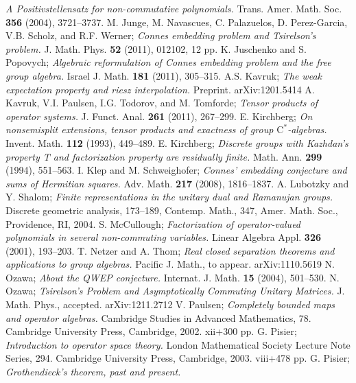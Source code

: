 \documentclass[12pt]{amsart}
\theoremstyle{definition}
\begin{document}
\begin{thebibliography}{MM}
\emph{A Positivstellensatz for non-commutative polynomials.}
Trans. Amer. Math. Soc. \textbf{356} (2004), 3721--3737.
 M. Junge, M. Navascues, C. Palazuelos, D. Perez-Garcia, V.B. Scholz, and R.F. Werner;
\emph{Connes embedding problem and Tsirelson's problem.}
J. Math. Phys. \textbf{52} (2011), 012102, 12 pp.
 K. Juschenko and S. Popovych;
\emph{Algebraic reformulation of Connes embedding problem and the free group algebra.}
Israel J. Math. \textbf{181} (2011), 305--315.
 A.S. Kavruk;
\emph{The weak expectation property and riesz interpolation.}
Preprint. arXiv:1201.5414
 A. Kavruk, V.I. Paulsen, I.G. Todorov, and M. Tomforde;
\emph{Tensor products of operator systems.}
J. Funct. Anal. \textbf{261} (2011), 267--299.
 E. Kirchberg;
\emph{On nonsemisplit extensions, tensor products and exactness of group $\mathrm{C}^*$-algebras.}
Invent. Math. \textbf{112} (1993), 449--489.
 E. Kirchberg;
\emph{Discrete groups with Kazhdan's property T and factorization property are residually finite.}
Math. Ann. \textbf{299} (1994), 551--563.
 I. Klep and M. Schweighofer;
\emph{Connes' embedding conjecture and sums of Hermitian squares.}
Adv. Math. \textbf{217} (2008), 1816--1837.
 A. Lubotzky and Y. Shalom;
\emph{Finite representations in the unitary dual and Ramanujan groups.}
Discrete geometric analysis, 173--189, Contemp. Math., 347, Amer. Math. Soc., Providence, RI, 2004.
 S. McCullough;
\emph{Factorization of operator-valued polynomials in several non-commuting variables.}
Linear Algebra Appl. \textbf{326} (2001), 193--203.
 T. Netzer and A. Thom;
\emph{Real closed separation theorems and applications to group algebras.}
Pacific J. Math., to appear. arXiv:1110.5619
 N. Ozawa;
\emph{About the QWEP conjecture.}
Internat. J. Math. \textbf{15} (2004), 501--530.
 N. Ozawa;
\emph{Tsirelson's Problem and Asymptotically Commuting Unitary Matrices.}
J. Math. Phys., accepted. arXiv:1211.2712
 V. Paulsen;
\emph{Completely bounded maps and operator algebras.}
Cambridge Studies in Advanced Mathematics, 78.
Cambridge University Press, Cambridge, 2002. xii+300 pp.
 G. Pisier;
\emph{Introduction to operator space theory.}
London Mathematical Society Lecture Note Series, 294.
Cambridge University Press, Cambridge, 2003. viii+478 pp.
 G. Pisier;
\emph{Grothendieck's theorem, past and present.}

\end{thebibliography}
\end{document}
